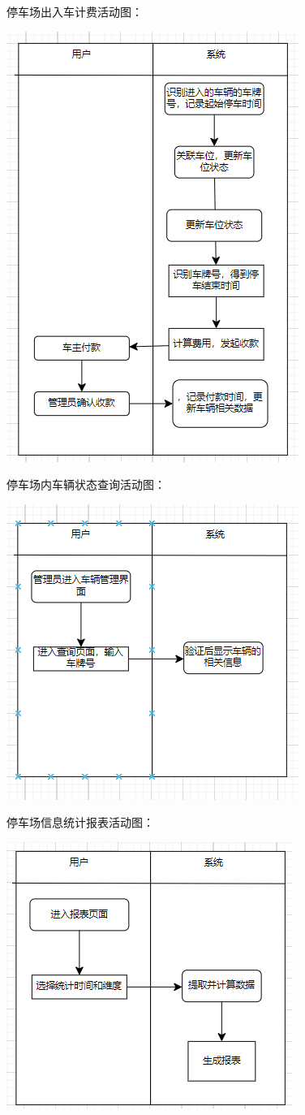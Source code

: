 \documentclass[]{article}
\let\oldincludegraphics\includegraphics
\renewcommand{\includegraphics}[2][]{%
  \begin{center}\oldincludegraphics[#1]{#2}\end{center}%
}
\begin{document}
停车场出入车计费活动图：
\includegraphics{media/2.8/image35.png}

停车场内车辆状态查询活动图：
\includegraphics{media/2.8/image36.png}

停车场信息统计报表活动图：
\includegraphics{media/2.8/image37.png}
\end{document}
